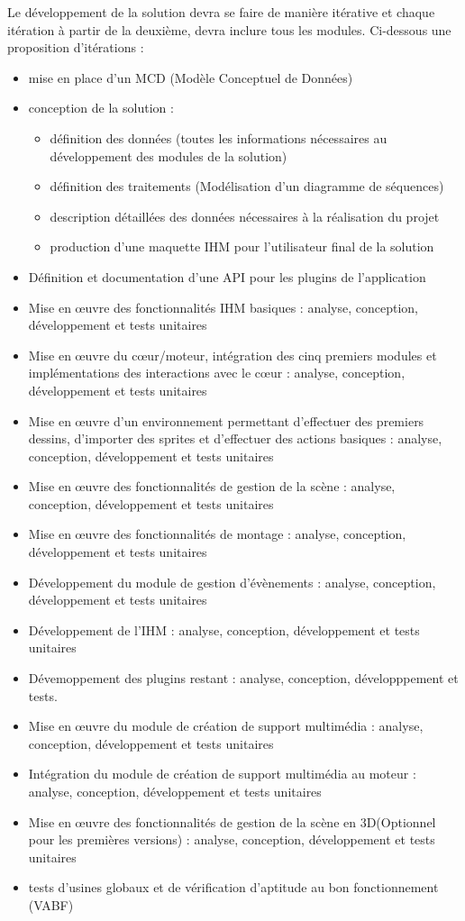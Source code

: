 \documentclass{ultimaade-fr}
\begin{document}
Le développement de la solution devra se faire de manière itérative et chaque itération à partir  de  la   deuxième,  devra  inclure  tous  les  modules.  Ci-dessous  une  proposition d’itérations :
\begin{itemize}
\item mise en place d’un MCD (Modèle Conceptuel de Données)
\item conception de la solution :
  \begin{itemize}
  \item définition des données (toutes les informations nécessaires au développement des modules de la solution)
  \item définition des traitements (Modélisation d’un diagramme de séquences)
  \item description détaillées des données nécessaires à la réalisation du projet
  \item production d’une maquette IHM pour l’utilisateur final de la solution
  \end{itemize}
\item Définition et documentation d'une API pour les plugins de l'application
\item Mise	en	œuvre	des	fonctionnalités	IHM	basiques :	analyse,	conception, développement et tests unitaires
\item Mise  en  œuvre  du  cœur/moteur,  intégration  des  cinq  premiers  modules  et implémentations	des	interactions	avec	le	cœur :	analyse,	conception, développement et tests unitaires
\item   Mise en œuvre d’un environnement permettant d’effectuer des premiers dessins, d’importer  des  sprites  et  d’effectuer  des  actions  basiques :  analyse,  conception, développement et tests unitaires
\item  Mise  en  œuvre  des  fonctionnalités  de  gestion  de  la  scène :  analyse, conception, développement et tests unitaires
\item Mise en œuvre des fonctionnalités de montage : analyse, conception, développement et tests unitaires
\item  Développement   du   module   de   gestion   d’évènements :   analyse,   conception, développement et tests unitaires
\item Développement	de l'IHM :	analyse,	conception, développement et tests unitaires
\item Dévemoppement des plugins restant : analyse, conception, développpement et tests. 
\item Mise en œuvre du module de création de support multimédia : analyse, conception, développement et tests unitaires
\item  Intégration du  module  de  création  de  support  multimédia  au moteur :  analyse, conception, développement et tests unitaires
\item  Mise en œuvre  des fonctionnalités de gestion de la scène en 3D(Optionnel pour les premières versions) : analyse, conception, développement et tests unitaires
\item tests d’usines globaux et de vérification d’aptitude au bon fonctionnement (VABF)
\end{itemize}
\end{document}
